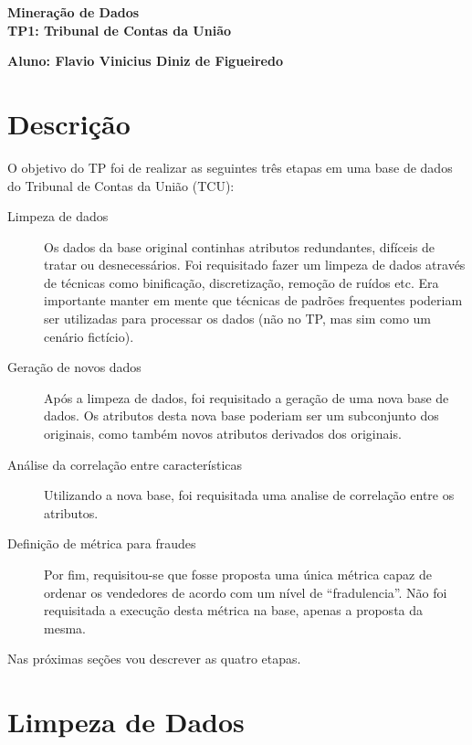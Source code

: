 \documentclass[brazil,a4paper,12pt]{article}
\begin{document}
\begin{center}
\LARGE
\textbf{Mineração de Dados}\\
\textbf{TP1: Tribunal de Contas da União}\\
\end{center}
\begin{center}
\textbf{Aluno: Flavio Vinicius Diniz de Figueiredo}
\end{center}

\section{Descrição}

O objetivo do TP foi de realizar as seguintes três etapas em uma base de dados do Tribunal de Contas da União (TCU):

\begin{description}

\item [Limpeza de dados] Os dados da base original continhas atributos redundantes, difíceis de tratar ou desnecessários. Foi requisitado fazer um limpeza de dados através de técnicas como binificação, discretização, remoção de ruídos etc. Era importante manter em mente que técnicas de padrões frequentes poderiam ser utilizadas para processar os dados (não no TP, mas sim como um cenário fictício).

\item [Geração de novos dados] Após a limpeza de dados, foi requisitado a geração de uma nova base de dados. Os atributos desta nova base poderiam ser um subconjunto dos originais, como também novos atributos derivados dos originais.

\item [Análise da correlação entre características] Utilizando a nova base, foi requisitada uma analise de correlação entre os atributos. 

\item [Definição de métrica para fraudes] Por fim, requisitou-se que fosse proposta uma única métrica capaz de ordenar os vendedores de acordo com um nível de ``fradulencia''. Não foi requisitada a execução desta métrica na base, apenas a proposta da mesma.

\end{description}

\noindent Nas próximas seções vou descrever as quatro etapas.

\section{Limpeza de Dados}
\end{document}

